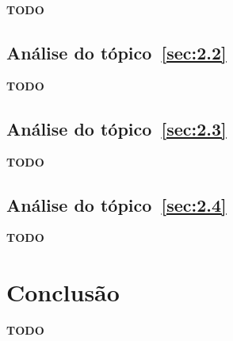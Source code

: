 \documentclass[12pt]{article}
\begin{document}
\textbf{TODO}

\subsection{Análise do tópico~\ref{sec:2.2}}\label{sec:analise2.2}

\textbf{TODO}

\subsection{Análise do tópico~\ref{sec:2.3}}\label{sec:analise2.3}

\textbf{TODO}

\subsection{Análise do tópico~\ref{sec:2.4}}\label{sec:analise2.4}

\textbf{TODO}

\section{Conclusão}\label{sec:Conclusao}

\textbf{TODO}


\end{document}
